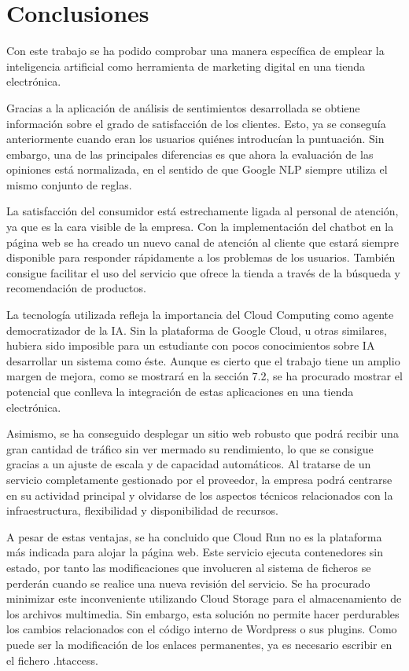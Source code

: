\chapter{Conclusiones}

Con este trabajo se ha podido comprobar una manera específica de emplear la inteligencia artificial como herramienta de marketing digital en una tienda electrónica.

Gracias a la aplicación de análisis de sentimientos desarrollada se obtiene información sobre el grado de satisfacción de los clientes. Esto, ya se conseguía anteriormente cuando eran los usuarios quiénes introducían la puntuación. Sin embargo, una de las principales diferencias es que ahora la evaluación de las opiniones está normalizada, en el sentido de que Google NLP siempre utiliza el mismo conjunto de reglas.

La satisfacción del consumidor está estrechamente ligada al personal de atención, ya que es la cara visible de la empresa. Con la implementación del chatbot en la página web se ha creado un nuevo canal de atención al cliente que estará siempre disponible para responder rápidamente a los problemas de los usuarios. También consigue facilitar el uso del servicio que ofrece la tienda a través de la búsqueda y recomendación de productos. 

La tecnología utilizada refleja la importancia del Cloud Computing como agente democratizador de la IA. Sin la plataforma de Google Cloud, u otras similares,  hubiera sido imposible para un estudiante con pocos conocimientos sobre IA desarrollar un sistema como éste. Aunque es cierto que el trabajo tiene un amplio margen de mejora, como se mostrará en la sección 7.2, se ha procurado mostrar el potencial que conlleva la integración de estas aplicaciones en una tienda electrónica.

Asimismo, se ha conseguido desplegar un sitio web robusto que podrá recibir una gran cantidad de tráfico sin ver mermado su rendimiento, lo que se consigue gracias a un ajuste de escala y de capacidad automáticos. Al tratarse de un servicio completamente gestionado por el proveedor, la empresa podrá centrarse en su actividad principal y olvidarse de los aspectos técnicos relacionados con la infraestructura, flexibilidad y disponibilidad de recursos.

A pesar de estas ventajas, se ha concluido que Cloud Run no es la plataforma más indicada para alojar la página web. Este servicio ejecuta contenedores sin estado, por tanto las modificaciones que involucren al sistema de ficheros se perderán cuando se realice una nueva revisión del servicio. Se ha procurado minimizar este inconveniente utilizando Cloud Storage para el almacenamiento de los archivos multimedia. Sin embargo, esta solución no permite hacer perdurables los cambios relacionados con el código interno de Wordpress o sus plugins. Como puede ser la modificación de los enlaces permanentes, ya es necesario escribir en el fichero .htaccess.

